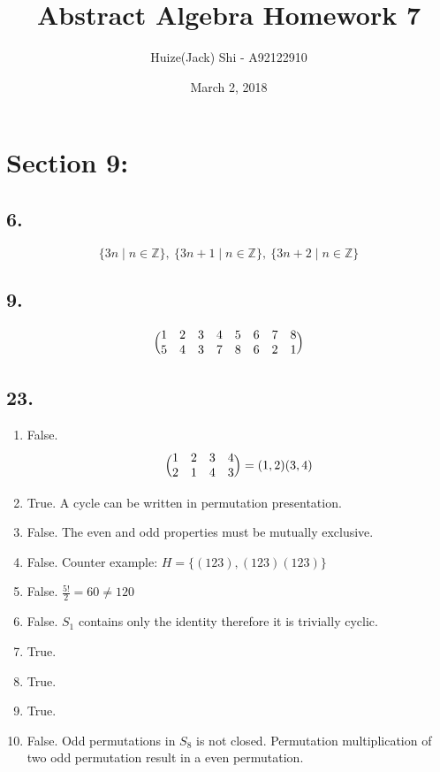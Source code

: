 \documentclass{article}
\title {Abstract Algebra Homework 7}
\date {March 2, 2018}
\author {Huize(Jack) Shi - A92122910}
\begin{document}
\maketitle

\section*{Section 9:}
\subsection*{6. } 
\begin{equation*}
	\{3n \mid n \in \mathbb{Z}\},\ 
	\{3n+1 \mid n \in \mathbb{Z}\},\ 
	\{3n+2 \mid n \in \mathbb{Z}\}
\end{equation*}

\subsection*{9. }
\begin{equation*}
\Bigl(\begin{matrix}
1 & 2 & 3 & 4 & 5 & 6 & 7 & 8\\
5 & 4 & 3 & 7 & 8 & 6 & 2 & 1\\
\end{matrix}\Bigr)
\end{equation*}

\subsection*{23. }
\begin{enumerate} [label=\alph*. ]
	\item{False.}  %
		\begin{equation*}
		\Bigl(\begin{matrix}
		1 & 2 & 3 & 4\\
		2 & 1 & 4 & 3\\
		\end{matrix}\Bigr) = (1, 2)(3, 4)
		\end{equation*}

	\item{True. }  %
		A cycle can be written in permutation presentation.

	\item{False. } %
		The even and odd properties must be mutually exclusive.

	\item{False. } %
		Counter example: $H = \{(1 2 3), (1 2 3)(1 2 3)\}$
	\item{False. } %
		$\frac{5!}{2} = 60 \neq 120$
	\item{False. } %
		$S_1$ contains only the identity therefore it is trivially cyclic.
	\item{True. } %
	\item{True. } %
	\item{True. } %
	\item{False. } %
		Odd permutations in $S_8$ is not closed. Permutation multiplication of two
		odd permutation result in a even permutation.
\end{enumerate}
\end{document}
